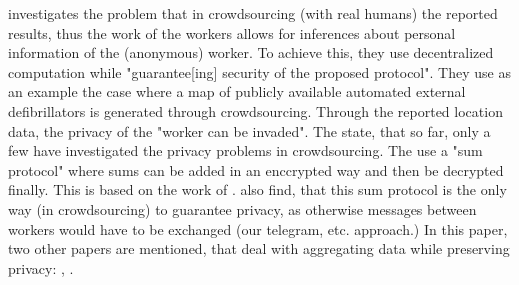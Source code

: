 \parencite{crowdsourcing} investigates the problem that in crowdsourcing (with real humans) the reported results, thus the work of the workers allows for inferences about personal information of the (anonymous) worker. To achieve this, they use decentralized computation while "guarantee[ing] security of the proposed protocol". They use as an example the case where a map of publicly available automated external defibrillators is generated through crowdsourcing. Through the reported location data, the privacy of the "worker can be invaded". The state, that so far, only a few have investigated the privacy problems in crowdsourcing. %
The use a "sum protocol" where sums can be added in an enccrypted way and then be decrypted finally. This is based on the work of \parencite{encryption}. \parencite{lin2005privacy} also find, that this sum protocol is the only way (in crowdsourcing) to guarantee privacy, as otherwise messages between workers would have to be exchanged (our telegram, etc. approach.) In this paper, two other papers are mentioned, that deal with aggregating data while preserving privacy: \parencite{burkhart2010sepia}, \parencite{shamir1979share}. 

